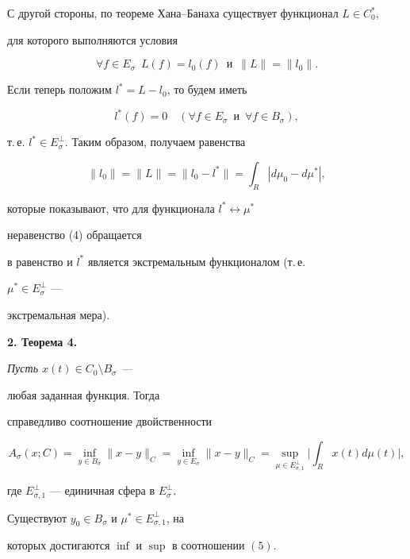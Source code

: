 


С другой стороны, по теореме Хана--Банаха существует функционал $L\in 


C^*_0$, 


для которого выполняются условия 


$$ 


\forall f\in E_\sigma\ \; L(f)=l_0(f)\ \; \text{и} 


\ \; \|L\|=\|l_0\|. 


$$ 


 


Если теперь положим $l^*=L-l_0$, то будем иметь 


$$ 


l^*(f)=0\quad 


(\forall f\in E_\sigma\ \; \text{и}\ \; \forall f\in B_\sigma), 


$$ 


т.\,е. $l^*\in E^\bot_\sigma$. Таким образом, получаем равенства 


$$ 


\|l_0\|=\|L\|=\|l_0-l^*\|=\int_R|d\mu_0-d\mu^*|, 


$$ 


которые показывают, что для функционала $l^*\leftrightarrow\mu^*$ 


неравенство (4) обращается 


в равенство и $l^*$ является экстремальным функционалом (т.\,е. 


$\mu^*\in E^\bot_\sigma$ --- 


экстремальная мера). 


\medskip 


 


{\bf 2. Теорема 4.} {\it Пусть $x(t)\in C_0\setminus B_\sigma$ --- 


любая заданная функция. Тогда 


справедливо соотношение двойственности 


\begin{equation} 


A_\sigma(x;C)=\inf_{y\in B_\sigma}\|x-y\|_C= 


\inf_{y\in E_\sigma}\|x-y\|_C=\sup_{\mu\in E^\bot_{\sigma,1}} 


\bigg|\int_R x(t)d\mu(t)\bigg|, 


\end{equation} 


где $E^\bot_{\sigma,1}$ --- единичная сфера в $E^\bot_\sigma$. 


Существуют $y_0\in B_\sigma$ и $\mu^*\in E^\bot_{\sigma,1}$, на 


которых достигаются $\inf$ и $\sup$ в соотношении $(5)$. 


} 


